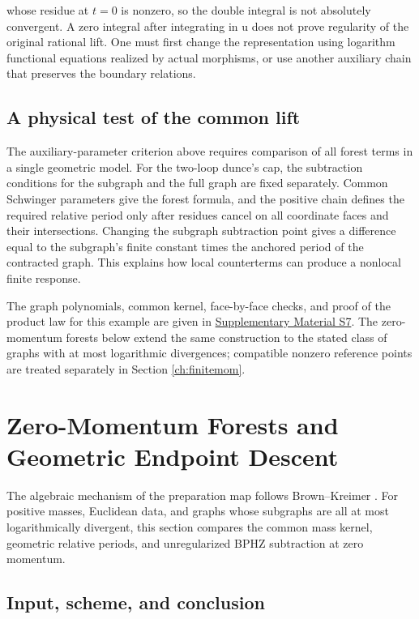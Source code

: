 \documentclass[11pt,a4paper,oneside]{article}
\theoremstyle{plain}
\theoremstyle{definition}
\theoremstyle{remark}
\numberwithin{equation}{section}
\newcommand{\otherref}[2]{\href{#1.pdf}{#2}}
\begin{document}
whose residue at \(t=0\) is nonzero, so the double integral is not absolutely convergent. A zero integral after integrating in u does not prove regularity of the original rational lift. One must first change the representation using logarithm functional equations realized by actual morphisms, or use another auxiliary chain that preserves the boundary relations.


\endgroup
\subsection{A physical test of the common lift}
The auxiliary-parameter criterion above requires comparison of all forest terms in a single geometric model. For the two-loop dunce's cap, the subtraction conditions for the subgraph and the full graph are fixed separately. Common Schwinger parameters give the forest formula, and the positive chain defines the required relative period only after residues cancel on all coordinate faces and their intersections. Changing the subgraph subtraction point gives a difference equal to the subgraph's finite constant times the anchored period of the contracted graph. This explains how local counterterms can produce a nonlocal finite response.

The graph polynomials, common kernel, face-by-face checks, and proof of the product law for this example are given in \otherref{feynman_periods_supplement_en}{Supplementary Material S7}. The zero-momentum forests below extend the same construction to the stated class of graphs with at most logarithmic divergences; compatible nonzero reference points are treated separately in Section \ref{ch:finitemom}.



\section{Zero-Momentum Forests and Geometric Endpoint Descent}\label{ch:zero}\label{ch:descent}

\begingroup

The algebraic mechanism of the preparation map follows Brown--Kreimer \cite{bk2011}. For positive masses, Euclidean data, and graphs whose subgraphs are all at most logarithmically divergent, this section compares the common mass kernel, geometric relative periods, and unregularized BPHZ subtraction at zero momentum.

\subsection{Input, scheme, and conclusion}\label{sec:zero:1}
\end{document}
